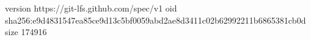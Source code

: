 version https://git-lfs.github.com/spec/v1
oid sha256:e9d4831547ea85ce9d13c5bf0059abd2ae8d3411c02b62992211b6865381cb0d
size 174916
